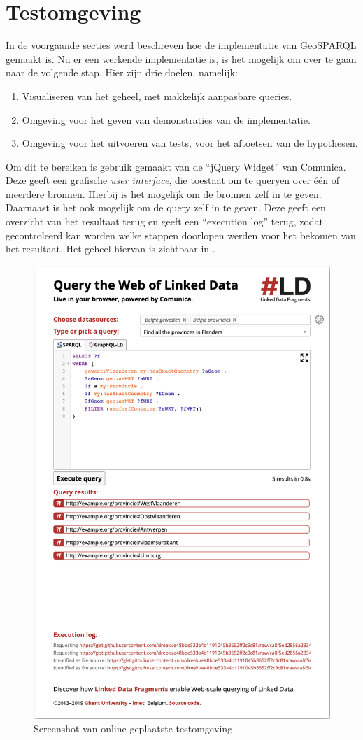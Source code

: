 \section{Testomgeving}
\label{sec:testomgeving}
In de voorgaande secties werd beschreven hoe de implementatie van GeoSPARQL gemaakt is. Nu er een werkende implementatie is, is het mogelijk om over te gaan naar de volgende stap. Hier zijn drie doelen, namelijk:
\begin{enumerate}
    \item Visualiseren van het geheel, met makkelijk aanpasbare queries.
    \item Omgeving voor het geven van demonstraties van de implementatie.
    \item Omgeving voor het uitvoeren van tests, voor het aftoetsen van de hypothesen.
\end{enumerate}

Om dit te bereiken is gebruik gemaakt van de ``jQuery Widget'' van Comunica. Deze geeft een grafische \textit{user interface}, die toestaat om te queryen over één of meerdere bronnen. Hierbij is het mogelijk om de bronnen zelf in te geven. Daarnaast is het ook mogelijk om de query zelf in te geven. Deze geeft een overzicht van het resultaat terug en geeft een ``execution log'' terug, zodat gecontroleerd kan worden welke stappen doorlopen werden voor het bekomen van het resultaat. Het geheel hiervan is zichtbaar in .

\begin{figure}
    \centering
    \includegraphics[width=0.8\linewidth]{images/testomgeving.png}
    \caption{Screenshot van online geplaatste testomgeving.}
    \label{fig:testomgeving}
\end{figure}

